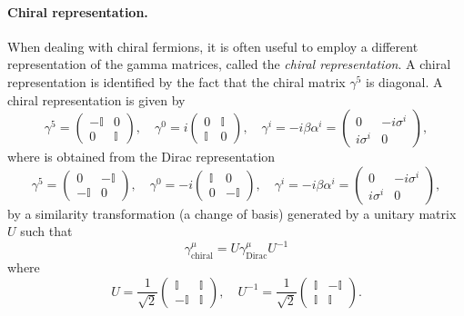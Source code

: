 \paragraph{Chiral representation.}
When dealing with chiral fermions, it is often useful to employ a different representation of the gamma matrices, called the \textit{chiral representation}. A chiral representation is identified by the fact that the chiral matrix \(\gamma^5\) is diagonal. A chiral representation is given by
\[
    \gamma^5 = \begin{pmatrix}
        -\mathbb{I} & 0          \\
        0           & \mathbb{I}
    \end{pmatrix}, \quad \gamma^{0} = i\begin{pmatrix}
        0          & \mathbb{I} \\
        \mathbb{I} & 0
    \end{pmatrix}, \quad \gamma^{i} = -i \beta \alpha^i = \begin{pmatrix}
        0         & -i \sigma^i \\
        i\sigma^i & 0
    \end{pmatrix},
\]
where is obtained from the Dirac representation
\[
    \gamma^5 = \begin{pmatrix}
        0           & -\mathbb{I} \\
        -\mathbb{I} & 0
    \end{pmatrix}, \quad \gamma^{0} = -i\begin{pmatrix}
        \mathbb{I} & 0           \\
        0          & -\mathbb{I}
    \end{pmatrix}, \quad \gamma^{i} = -i \beta \alpha^i = \begin{pmatrix}
        0         & -i \sigma^i \\
        i\sigma^i & 0
    \end{pmatrix},
\]
by a similarity transformation (a change of basis) generated by a unitary matrix \(U\) such that
\[
    \gamma^{\mu}_{\text{chiral}} = U \gamma^{\mu}_\text{Dirac} U^{-1}
\]
where
\[
    U = \frac{1}{\sqrt{2}} \begin{pmatrix}
        \mathbb{I}  & \mathbb{I} \\
        -\mathbb{I} & \mathbb{I}
    \end{pmatrix}, \quad U^{-1} = \frac{1}{\sqrt{2}} \begin{pmatrix}
        \mathbb{I} & -\mathbb{I} \\
        \mathbb{I} & \mathbb{I}
    \end{pmatrix}.
\]
